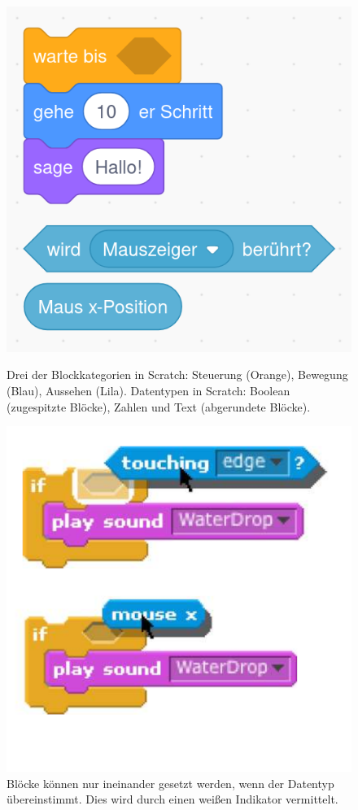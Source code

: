 \begin{figure}[!ht]
  \includegraphics[width=\linewidth]{assets/scratch-types.png}
  \caption{Drei der Blockkategorien in Scratch: Steuerung (Orange), Bewegung (Blau), Aussehen (Lila). Datentypen in Scratch: Boolean (zugespitzte Blöcke), Zahlen und Text (abgerundete Blöcke). \parencite{scratchfoundationScratch}}
  \label{fig:scratch-types}
  \endminipage
  \hfill
  \includegraphics[width=\linewidth]{assets/scratch-drop.png}
  \caption{Blöcke können nur ineinander gesetzt werden, wenn der Datentyp übereinstimmt. Dies wird durch einen weißen Indikator vermittelt. \parencite{scratchfoundationScratch}}
  \label{fig:scratch-drop}
  \endminipage
\end{figure}

